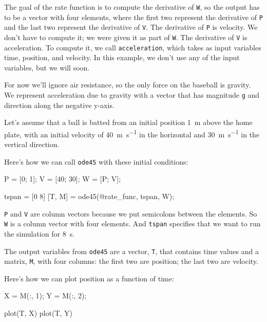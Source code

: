 The goal of the rate function is to compute the derivative of \lstinline{W}, so the output has to be a vector with four elements, where the first two represent the derivative of \lstinline{P}  and the last two represent the derivative of \lstinline{V}.
The derivative of \lstinline{P} is velocity.  We don't have to compute it; we were given it as part of \lstinline{W}.
The derivative of \lstinline{V} is acceleration.  To compute it, we call \lstinline{acceleration}, which takes as input variables time, position, and velocity.  In this example, we don't use any of the input variables, but we will soon.


For now we'll ignore air resistance, so the only force on the baseball is gravity.  We represent acceleration due to gravity with a vector that has magnitude \lstinline{g} and direction along the negative y-axis.

Let's assume that a ball is batted from an initial position \SI{1}{\meter} above the home plate, with an initial velocity of \SI{40}{\meter\per\second} in the horizontal and \SI{30}{\meter\per\second} in the vertical direction.


Here's how we can call \lstinline{ode45} with these initial conditions:
 
\begin{code}
    P = [0; 1];       %
    V = [40; 30];     %
    W = [P; V];       %
    
    tspan = [0 8]
    [T, M] = ode45(@rate_func, tspan, W);
\end{code}

\lstinline{P} and \lstinline{V} are column vectors because we put semicolons between the elements.  
So \lstinline{W} is a column vector with four elements.
And \lstinline{tspan} specifies that we want to run the simulation for \SI{8}{\second}.


The output variables from \lstinline{ode45} are a vector, 
\lstinline{T}, that contains time values and a matrix, \lstinline{M}, with four columns: the first two are position; the last two are velocity.

Here's how we can plot position as a function of time:

\begin{code}
    X = M(:, 1);
    Y = M(:, 2);
    
    plot(T, X)
    plot(T, Y)
\end{code}

